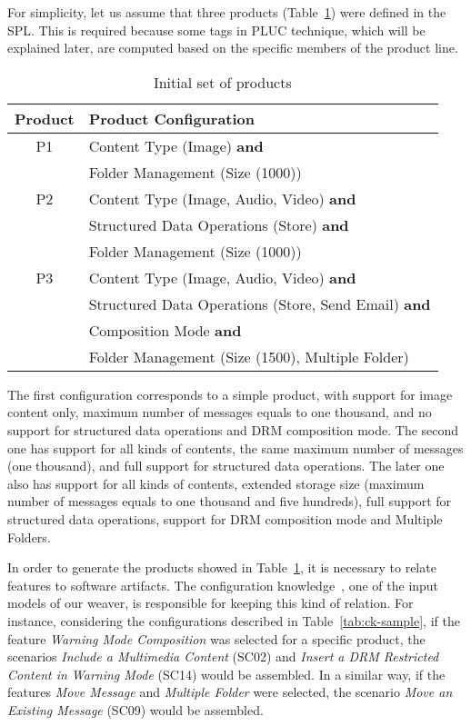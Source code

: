 \documentclass{acm_proc_article-sp}
\begin{document}
For simplicity, let us assume that three products (Table~\ref{tab:initial-products}) were defined in the SPL. 
This is required because some tags in PLUC technique, which will be explained later, are computed based on the specific members 
of the product line. 

\begin{table}[hb]
\centering
\caption{Initial set of products}
\label{tab:initial-products}
\begin{small}
\begin{tabular}{|c|l|} \hline
Product & Product Configuration \\ \hline
P1  & Content Type (Image) {\bf and} \\ 
      & Folder Management (Size (1000))\\ \hline
P2  & Content Type (Image, Audio, Video) {\bf and} \\ 
      & Structured Data Operations (Store) {\bf and} \\ 
      & Folder Management (Size (1000))  \\ \hline
P3  & Content Type (Image, Audio, Video) {\bf and} \\ 
      & Structured Data Operations (Store, Send Email) {\bf and}\\
      & Composition Mode {\bf and} \\
      & Folder Management (Size (1500), Multiple Folder)  \\ \hline 
\end{tabular}
\end{small}
\end{table}

The first configuration corresponds to a simple product, with support for image content only, maximum number of messages equals to one thousand, and no support for structured data operations and DRM composition mode. The second one has support for all kinds of contents, the same maximum number of messages (one thousand), and full support for structured data operations. The later one also has support for all kinds of contents, extended storage size (maximum number of messages equals to one thousand and five hundreds), full support for structured data operations, support for DRM composition mode and Multiple Folders. 

In order to generate the products showed in Table~\ref{tab:initial-products}, it is necessary to relate features to software artifacts. The configuration knowledge~\cite{czarnecki-book, phol-spl-book}, one of the input models of our weaver, is responsible for keeping this kind of relation. For instance, considering the configurations described in Table~\ref{tab:ck-sample}, if the feature \emph{Warning Mode Composition} was selected for a specific product, the scenarios \emph{Include a Multimedia Content} (SC02) and \emph{Insert a DRM Restricted Content in Warning Mode} (SC14) would be assembled. In a similar way, if the features \emph{Move Message} and \emph{Multiple Folder} were selected, the scenario \emph{Move an Existing Message} (SC09) would be assembled. 
\end{document}
